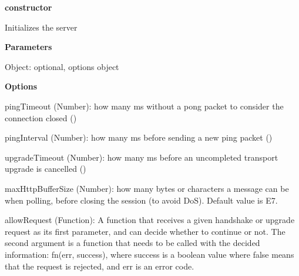 \begin{DoxyItemize}
\item {\bfseries constructor}
\begin{DoxyItemize}
\item Initializes the server
\item {\bfseries Parameters}
\begin{DoxyItemize}
\item {\ttfamily Object}\+: optional, options object
\end{DoxyItemize}
\item {\bfseries Options}
\begin{DoxyItemize}
\item {\ttfamily ping\+Timeout} ({\ttfamily Number})\+: how many ms without a pong packet to consider the connection closed ({})
\item {\ttfamily ping\+Interval} ({\ttfamily Number})\+: how many ms before sending a new ping packet ({})
\item {\ttfamily upgrade\+Timeout} ({\ttfamily Number})\+: how many ms before an uncompleted transport upgrade is cancelled ({})
\item {\ttfamily max\+Http\+Buffer\+Size} ({\ttfamily Number})\+: how many bytes or characters a message can be when polling, before closing the session (to avoid DoS). Default value is {\+E7}.
\item {\ttfamily allow\+Request} ({\ttfamily Function})\+: A function that receives a given handshake or upgrade request as its first parameter, and can decide whether to continue or not. The second argument is a function that needs to be called with the decided information\+: {\ttfamily fn(err, success)}, where {\ttfamily success} is a boolean value where false means that the request is rejected, and err is an error code.

\end{DoxyItemize}
\end{DoxyItemize}
\end{DoxyItemize}
